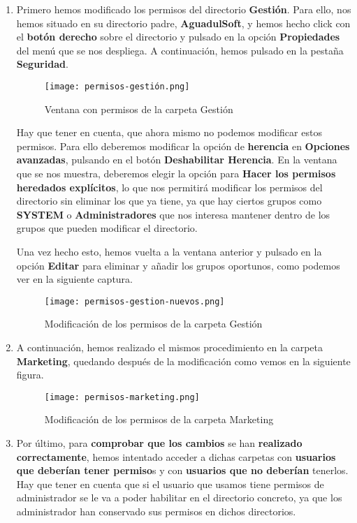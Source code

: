 \begin{enumerate}
    \item Primero hemos modificado los permisos del directorio \textbf{Gestión}. Para ello, nos hemos situado en su directorio padre, \textbf{AguadulSoft}, y hemos hecho click con el \textbf{botón derecho} sobre el directorio y pulsado en la opción \textbf{Propiedades} del menú que se nos despliega. A continuación, hemos pulsado en la pestaña \textbf{Seguridad}.

    \begin{figure}[H]
        \centering
        \texttt{[image: permisos-gestión.png]}
        \caption{Ventana con permisos de la carpeta Gestión}
    \end{figure}

    Hay que tener en cuenta, que ahora mismo no podemos modificar estos permisos. Para ello deberemos modificar la opción de \textbf{herencia} en \textbf{Opciones avanzadas}, pulsando en el botón \textbf{Deshabilitar Herencia}. En la ventana que se nos muestra, deberemos elegir la opción para \textbf{Hacer los permisos heredados explícitos}, lo que nos permitirá modificar los permisos del directorio sin eliminar los que ya tiene, ya que hay ciertos grupos como \textbf{SYSTEM} o \textbf{Administradores} que nos interesa mantener dentro de los grupos que pueden modificar el directorio.

    Una vez hecho esto, hemos vuelta a la ventana anterior y pulsado en la opción \textbf{Editar} para eliminar y añadir los grupos oportunos, como podemos ver en la siguiente captura.

    \begin{figure}[H]
        \centering
        \texttt{[image: permisos-gestion-nuevos.png]}
        \caption{Modificación de los permisos de la carpeta Gestión}
    \end{figure}

    \item A continuación, hemos realizado el mismos procedimiento en la carpeta \textbf{Marketing}, quedando después de la modificación como vemos en la siguiente figura.

    \begin{figure}[H]
        \centering
        \texttt{[image: permisos-marketing.png]}
        \caption{Modificación de los permisos de la carpeta Marketing}
    \end{figure}

    \item Por último, para \textbf{comprobar que los cambios} se han \textbf{realizado correctamente}, hemos intentado acceder a dichas carpetas con \textbf{usuarios que deberían tener permiso}s y con \textbf{usuarios que no deberían} tenerlos. Hay que tener en cuenta que si el usuario que usamos tiene permisos de administrador se le va a poder habilitar en el directorio concreto, ya que los administrador han conservado sus permisos en dichos directorios.


\end{enumerate}
